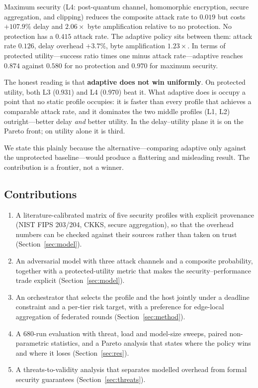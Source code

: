 \documentclass[journal,10pt]{IEEEtran}
\begin{document}
Maximum security (L4: post-quantum channel, homomorphic encryption, secure
aggregation, and clipping) reduces the composite attack rate to $0.019$ but
costs $+107.9\%$ delay and $2.06\times$ byte amplification relative to no
protection. No protection has a $0.415$ attack rate. The adaptive policy sits
between them: attack rate $0.126$, delay overhead $+3.7\%$, byte amplification
$1.23\times$. In terms of protected utility---success ratio times one minus
attack rate---adaptive reaches $0.874$ against $0.580$ for no protection and
$0.970$ for maximum security.

The honest reading is that \textbf{adaptive does not win uniformly}. On
protected utility, both L3 ($0.931$) and L4 ($0.970$) beat it. What adaptive
does is occupy a point that no static profile occupies: it is faster than every
profile that achieves a comparable attack rate, and it dominates the two middle
profiles (L1, L2) outright---better delay \emph{and} better utility. In the
delay--utility plane it is on the Pareto front; on utility alone it is third.

We state this plainly because the alternative---comparing adaptive only against
the unprotected baseline---would produce a flattering and misleading result. The
contribution is a frontier, not a winner.

\subsection{Contributions}
\begin{enumerate}
\item A literature-calibrated matrix of five security profiles with explicit
  provenance (NIST FIPS 203/204, CKKS, secure aggregation), so that the
  overhead numbers can be checked against their sources rather than taken on
  trust (Section~\ref{sec:model}).
\item An adversarial model with three attack channels and a composite
  probability, together with a protected-utility metric that makes the
  security--performance trade explicit (Section~\ref{sec:model}).
\item An orchestrator that selects the profile and the host jointly under a
  deadline constraint and a per-tier risk target, with a preference for
  edge-local aggregation of federated rounds (Section~\ref{sec:method}).
\item A $680$-run evaluation with threat, load and model-size sweeps, paired
  non-parametric statistics, and a Pareto analysis that states where the
  policy wins and where it loses (Section~\ref{sec:res}).
\item A threats-to-validity analysis that separates modelled overhead from
  formal security guarantees (Section~\ref{sec:threats}).
\end{enumerate}
\end{document}
